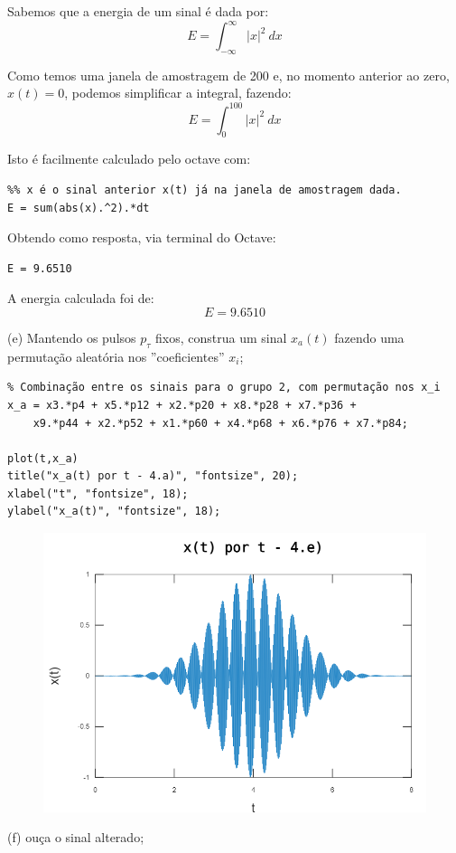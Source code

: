 \documentclass[10pt]{article}
\begin{document}
Sabemos que a energia de um sinal é dada por:
\[E = \int_{-\infty}^{\infty} |x|^2 \ dx\]

Como temos uma janela de amostragem de 200 e, no momento anterior ao zero, $x(t) = 0$, podemos simplificar a integral, fazendo:
\[E = \int_{0}^{100} |x|^2 \ dx\]

Isto é facilmente calculado pelo octave com:
\begin{verbatim}
%% x é o sinal anterior x(t) já na janela de amostragem dada.
E = sum(abs(x).^2).*dt
\end{verbatim}

Obtendo como resposta, via terminal do Octave:
\begin{verbatim}
E = 9.6510
\end{verbatim}

A energia calculada foi de:
\[\boxed{E = 9.6510}\]

(e) Mantendo os pulsos $p_{\tau}$ fixos, construa um sinal $x_a(t)$ fazendo uma permutação aleatória nos ''coeficientes'' $x_i$;
\begin{verbatim}    
% Combinação entre os sinais para o grupo 2, com permutação nos x_i
x_a = x3.*p4 + x5.*p12 + x2.*p20 + x8.*p28 + x7.*p36 + 
    x9.*p44 + x2.*p52 + x1.*p60 + x4.*p68 + x6.*p76 + x7.*p84;

plot(t,x_a)
title("x_a(t) por t - 4.a)", "fontsize", 20);
xlabel("t", "fontsize", 18);
ylabel("x_a(t)", "fontsize", 18);    
\end{verbatim}
\begin{figure}[h]
    \includegraphics[scale=0.6]{questao4e}
    \centering
\end{figure}
(f) ouça o sinal alterado;
\end{document}
